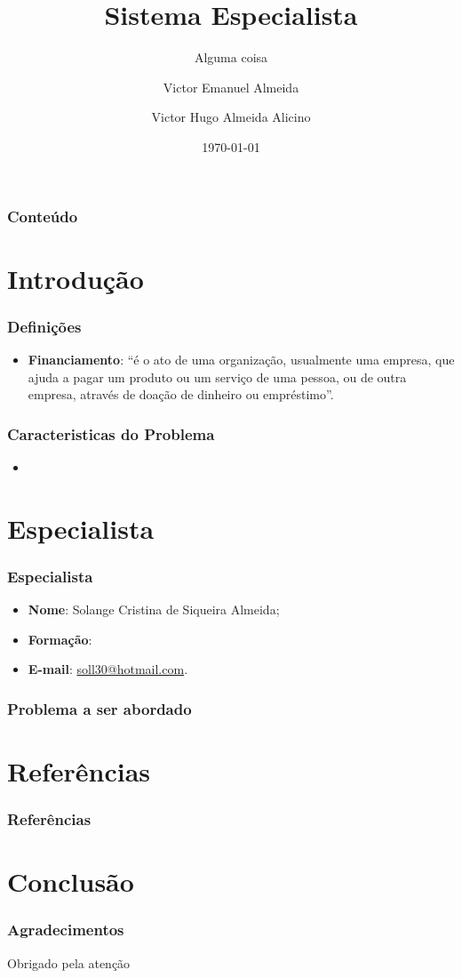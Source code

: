 \documentclass[12pt]{beamer}
\author[Victor * Almeida *]{Victor Emanuel Almeida \and Victor Hugo Almeida Alicino}
\title{Sistema Especialista}
\subtitle{Alguma coisa}
\date{\today}
\institute{UNIOESTE}
\begin{document}
\frame{\titlepage}

\begin{frame}
    \frametitle{Conteúdo}
    \tableofcontents
\end{frame}

\section{Introdução}
\begin{frame}
    \frametitle{Definições}
    \begin{itemize}
        \item\textbf{Financiamento}: ``é o ato de uma organização, usualmente uma empresa, que ajuda a pagar um produto ou um serviço de uma pessoa, ou de outra empresa, através de doação de dinheiro ou empréstimo''\cite{financiamento}.
    \end{itemize}
\end{frame}

\begin{frame}
    \frametitle{Caracteristicas do Problema}

    \begin{itemize}
        \item 
    \end{itemize}

\end{frame}

\section{Especialista}
\begin{frame}
    \frametitle{Especialista}
    \begin{itemize}
        \item\textbf{Nome}: Solange Cristina de Siqueira Almeida;
        \item\textbf{Formação}:
        \item\textbf{E-mail}: \url{soll30@hotmail.com}.
    \end{itemize}
\end{frame}

\begin{frame}
    \frametitle{Problema a ser abordado}
\end{frame}

\section{Referências}\label{Referências}
\begin{frame}[allowframebreaks]
    \frametitle{Referências}
    
\end{frame}

\section{Conclusão}
\begin{frame}
    \frametitle{Agradecimentos}
    \centering
    \Huge Obrigado pela atenção
\end{frame}
\end{document}
